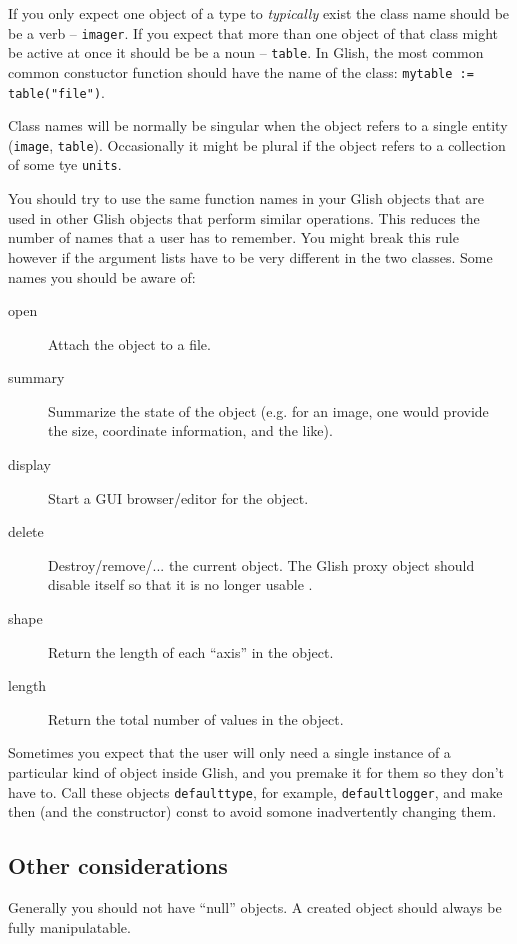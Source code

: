 If you only expect one object of a type to {\em typically} exist the
class name should be be a verb -- {\tt imager}. If you expect that more
than one object of that class might be active at once it should be be
a noun -- {\tt table}. In Glish, the most common common constuctor
function should have the name of the class: {\tt mytable := table("file")}.

Class names will be normally be singular when the object refers to a
single entity ({\tt image}, {\tt table}). Occasionally it might be
plural if the object refers to a collection of some tye {\tt units}.

You should try to use the same function names in your Glish objects that
are used in other Glish objects that perform similar operations. This
reduces the number of names that a user has to remember. You might break
this rule however if the argument lists have to be very different in the
two classes. Some names you should be aware of:
\begin{description}
    \item[open]    Attach the object to a file.
    \item[summary] Summarize the state of the object (e.g. for an image,
                   one would provide the size, coordinate information,
                   and the like).
    \item[display] Start a GUI browser/editor for the object.
    \item[delete]  Destroy/remove/... the current object. The Glish proxy
                   object should disable itself so that it is no longer
                   usable .
    \item[shape]   Return the length of each ``axis'' in the object.
    \item[length]  Return the total number of values in the object.
\end{description}

Sometimes you expect that the user will only need a single instance of a
particular kind of object inside Glish, and you premake it for them so
they don't have to. Call these objects \texttt{defaulttype}, for example,
\texttt{defaultlogger}, and make then (and the constructor) const to
avoid somone inadvertently changing them.

\subsection{Other considerations}

Generally you should not have ``null'' objects. A created object
should always be fully manipulatable.

